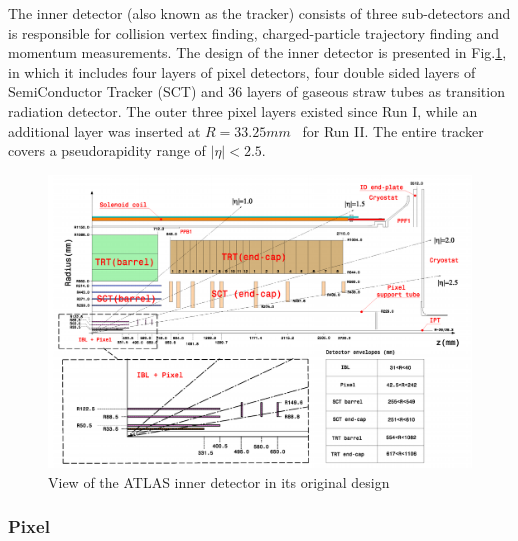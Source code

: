 \label{sec:detector-id}

The inner detector (also known as the tracker) consists of three sub-detectors and is responsible for collision vertex finding, charged-particle trajectory finding and momentum measurements. The design of the inner detector is presented in Fig.\ref{fig:detector-id}, in which it includes four layers of pixel detectors, four double sided layers of SemiConductor Tracker (SCT) and 36 layers of gaseous straw tubes as transition radiation detector. The outer three pixel layers existed since Run I, while an additional layer was inserted at $R=33.25mm$~\cite{CERN-LHCC-2010-013} for Run II. The entire tracker covers a pseudorapidity range of $|\eta|<2.5$.


\begin{figure}[htpb!]
\begin{center}
  \includegraphics[width=0.9\linewidth]{figures/detector/ID}
\caption{View of the ATLAS inner detector in its original design\cite{IBLProd} }
\label{fig:detector-id}
\end{center}
\end{figure}



\subsubsection{Pixel}

